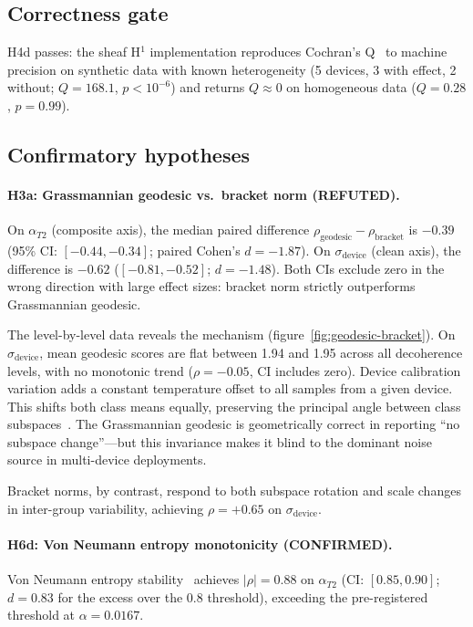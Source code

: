 \documentclass[11pt]{article}
\begin{document}
\subsection{Correctness gate}

H4d passes: the sheaf H$^1$ implementation reproduces Cochran's
Q~\citep{cochran1954combination} to machine precision on synthetic data with known heterogeneity (5 devices,
3 with effect, 2 without; $Q = 168.1$, $p < 10^{-6}$) and returns
$Q \approx 0$ on homogeneous data ($Q = 0.28$, $p = 0.99$).

\subsection{Confirmatory hypotheses}

\paragraph{H3a: Grassmannian geodesic vs.\ bracket norm (REFUTED).}
On $\alpha_{T2}$ (composite axis), the median paired difference
$\rho_\text{geodesic} - \rho_\text{bracket}$ is $-0.39$ (95\% CI:
$[-0.44, -0.34]$; paired Cohen's $d = -1.87$).  On
$\sigma_\text{device}$ (clean axis), the difference is $-0.62$
($[-0.81, -0.52]$; $d = -1.48$).  Both CIs exclude zero in the wrong
direction with large effect sizes: bracket norm strictly outperforms
Grassmannian geodesic.

The level-by-level data reveals the mechanism
(figure~\ref{fig:geodesic-bracket}).
On $\sigma_\text{device}$, mean geodesic scores are flat between 1.94
and 1.95 across all decoherence levels, with no monotonic trend
($\rho = -0.05$, CI includes zero).
Device calibration variation adds a constant temperature offset to all
samples from a given device.  This shifts both class means equally,
preserving the principal angle between class
subspaces~\citep{bjorck1973numerical,knyazev2002principal}.  The Grassmannian geodesic is
geometrically correct in reporting ``no subspace change''---but this invariance makes it blind to the dominant
noise source in multi-device deployments.

Bracket norms, by contrast, respond to both subspace rotation and
scale changes in inter-group variability, achieving $\rho = +0.65$
on $\sigma_\text{device}$.

\paragraph{H6d: Von Neumann entropy monotonicity (CONFIRMED).}
Von Neumann entropy stability~\citep{neumann1955mathematical} achieves
$|\rho| = 0.88$ on $\alpha_{T2}$ (CI: $[0.85, 0.90]$; $d = 0.83$
for the excess over the 0.8 threshold), exceeding the pre-registered
threshold at $\alpha = 0.0167$.
\end{document}
